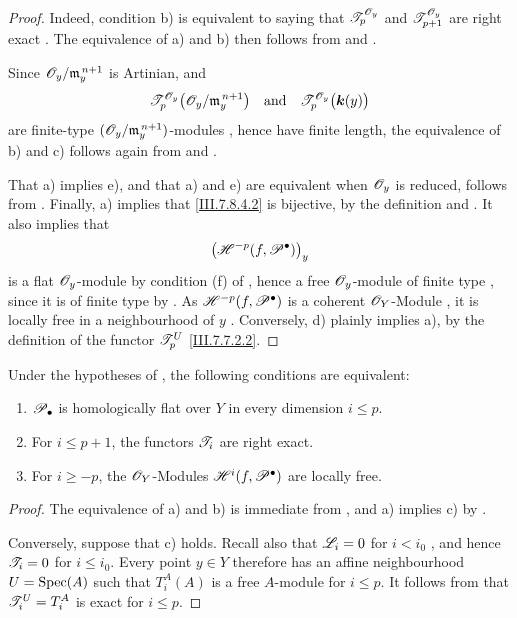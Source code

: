 \begin{proof}
Indeed, condition b) is equivalent to saying that
$\mathscr{T}_p^{\mathscr{O}_y}$ and $\mathscr{T}_{p+1}^{\mathscr{O}_y}$ are
right exact .  The equivalence of a) and b)
then follows from  and
.

Since $\mathscr{O}_y/\mathfrak m_y^{\,n+1}$ is Artinian, and
\[
  \mathscr{T}_p^{\mathscr{O}_y}
    \bigl(\mathscr{O}_y/\mathfrak m_y^{\,n+1}\bigr)
  \quad\hbox{and}\quad
  \mathscr{T}_p^{\mathscr{O}_y}\bigl(\boldsymbol{k}(y)\bigr)
\]
are finite-type
$(\mathscr{O}_y/\mathfrak m_y^{\,n+1})$-modules
, hence have finite length, the equivalence
of b) and c) follows again from  and
.

That a) implies e), and that a) and e) are equivalent when
$\mathscr{O}_y$ is reduced, follows from .
Finally, a) implies that \eqref{III.7.8.4.2} is bijective,
by the definition  and
.  It also implies that
\[
  \bigl(\mathscr{H}^{-p}(f,\mathscr{P}^\bullet)\bigr)_y
\]
is a flat $\mathscr{O}_y$-module by condition (f) of
, hence a
free $\mathscr{O}_y$-module of finite type
, since it is of finite type by
.  As
$\mathscr{H}^{-p}(f,\mathscr{P}^\bullet)$ is a coherent
$\mathscr{O}_Y$-Module , it is locally free in
a neighbourhood of $y$ .
Conversely, d) plainly implies a), by the definition of the
functor $\mathscr{T}_p^U$ \eqref{III.7.7.2.2}.
\end{proof}

\begin{proposition}[7.8.5]
\label{III.7.8.5}
Under the hypotheses of , the following
conditions are equivalent:
\begin{enumerate}
  \item[a)] $\mathscr{P}_\bullet$ is homologically flat over $Y$
  in every dimension $i\leq p$.
  \item[b)] For $i\leq p+1$, the functors $\mathscr{T}_i$ are
  right exact.
  \item[c)] For $i\geq -p$, the $\mathscr{O}_Y$-Modules
  $\mathscr{H}^{i}(f,\mathscr{P}^\bullet)$ are locally free.
\end{enumerate}
\end{proposition}

\begin{proof}
The equivalence of a) and b) is immediate from
, and a) implies c) by
.

Conversely, suppose that c) holds.  Recall also that
$\mathscr{L}_i=0$ for $i<i_0$ , and hence
$\mathscr{T}_i=0$ for $i\leq i_0$.  Every point $y\in Y$
therefore has an affine neighbourhood
$U=\operatorname{Spec}(A)$ such that $T_i^A(A)$ is a free $A$-module for
$i\leq p$.  It follows from  that
$\mathscr{T}_i^U=T_i^A$ is exact for $i\leq p$.
\end{proof}

